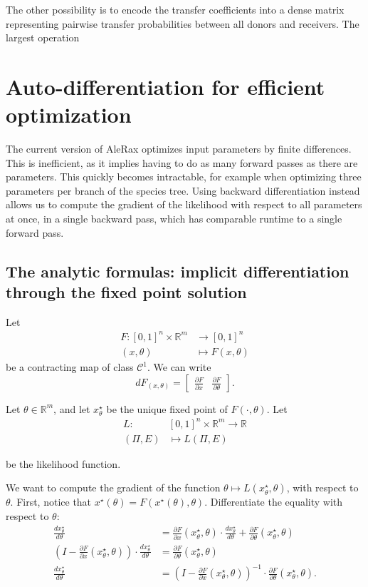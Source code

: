 \documentclass{article}
\newcommand{\1}{\mathbf{1}}
\newcommand{\Rbb}{\mathbb{R}}
\begin{document}
The other possibility is to encode the transfer coefficients into a dense matrix representing pairwise transfer probabilities between all donors and receivers. The largest operation 

\section{Auto-differentiation for efficient optimization}
The current version of AleRax optimizes input parameters by finite differences. This is inefficient, as it implies having to do as many forward passes as there are parameters. This quickly becomes intractable, for example when optimizing three parameters per branch of the species tree. Using backward differentiation instead allows us to compute the gradient of the likelihood with respect to all parameters at once, in a single backward pass, which has comparable runtime to a single forward pass.
\subsection{The analytic formulas: implicit differentiation through the fixed point solution}
Let
\begin{align*}
    F: [0,1]^n \times \Rbb^m &\to [0,1]^n\\
    (x,\theta) &\mapsto F(x,\theta)
\end{align*}
be a contracting map of class $\mathcal{C}^1$. We can write
\[
    dF_{(x,\theta)} =
    \begin{bmatrix}
    \frac{\partial F}{\partial x} & \frac{\partial F}{\partial \theta}
    \end{bmatrix}.
\]

Let $\theta\in \Rbb^m$, and let $x^\star_\theta$ be the unique fixed point of $F(\cdot, \theta)$. Let
\begin{align*}
L:& [0,1]^n \times \Rbb^m \to \Rbb\\
(\Pi, E) &\mapsto L(\Pi, E)
\end{align*}

be the likelihood function.

We want to compute the gradient of the function $\theta \mapsto L(x^\star_\theta, \theta)$, with respect to $\theta$. First, notice that $x^\star(\theta) = F(x^\star(\theta), \theta)$. Differentiate the equality with respect to $\theta$:
\begin{align*}
    \frac{dx^\star_\theta}{d\theta} &= \frac{\partial F}{\partial x}(x^\star_\theta, \theta) \cdot \frac{dx^\star_\theta}{d\theta} + \frac{\partial F}{\partial \theta}(x^\star_\theta, \theta)\\
    (I - \frac{\partial F}{\partial x}(x^\star_\theta, \theta))\cdot \frac{dx^\star_\theta}{d\theta} &= \frac{\partial F}{\partial \theta}(x^\star_\theta, \theta)\\
    \frac{dx^\star_\theta}{d\theta} &= (I - \frac{\partial F}{\partial x}(x^\star_\theta, \theta))^{-1} \cdot \frac{\partial F}{\partial \theta}(x^\star_\theta, \theta).
\end{align*} 
\end{document}
